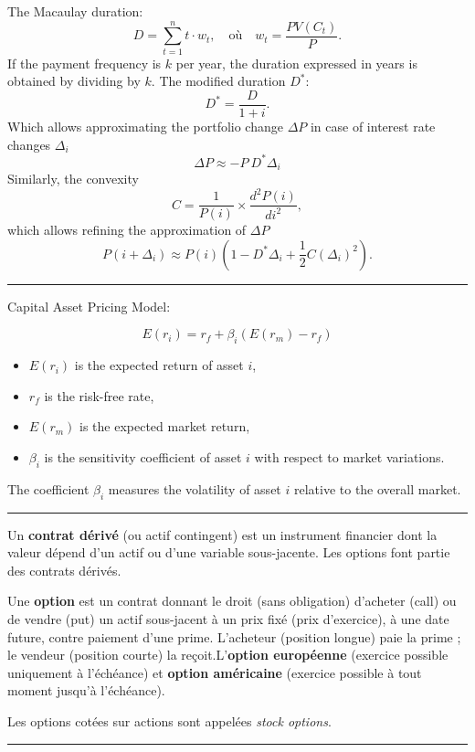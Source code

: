 \begin{f}
	
The Macaulay duration:
\[ 		
D = \sum_{t=1}^{n} t \cdot w_t, \quad \text{où} \quad w_t = \frac{PV(C_t)}{P}.
 \]	
If the payment frequency is $k$ per year, the duration expressed in years is obtained by dividing by $k$.
The modified duration $D^*$:
\[ 	
D^* = \frac{D}{1 + i}.
 \]
Which allows approximating the portfolio change $\Delta P$ in case of interest rate changes $\Delta_i$
\[ 
\Delta P \approx -P\ D^* \Delta_i 
 \]
Similarly, the convexity
\[ 	
C = \frac{1}{P(i)} \times \frac{d^2 P(i)}{di^2},
 \]
which allows refining the approximation of $\Delta P$
\[ 	
P(i + \Delta_i) \approx P(i) \left( 1 -D^*\Delta_i + \frac{1}{2} C (\Delta_i)^2 \right).
 \]
\end{f}
\hrule



\begin{f}[CAPM]
	Capital Asset Pricing Model:

\[
E(r_i) = r_f + \beta_i (E(r_m) - r_f)
\]

\begin{itemize}
	\item \( E(r_i) \) is the expected return of asset \( i \),
	\item \( r_f \) is the risk-free rate,
	\item \( E(r_m) \) is the expected market return,
	\item \( \beta_i \) is the sensitivity coefficient of asset \( i \) with respect to market variations.
\end{itemize}


The coefficient \( \beta_i \) measures the volatility of asset \( i \) relative to the overall market.

\end{f}
\hrule


\begin{f}

Un \textbf{contrat dérivé} (ou actif contingent) est un instrument financier dont la valeur dépend d’un actif ou d’une variable sous-jacente. Les options font partie des contrats dérivés.


Une \textbf{option} est un contrat donnant le droit (sans obligation) d’acheter (call) ou de vendre (put) un actif sous-jacent à un prix fixé (prix d’exercice), à une date future, contre paiement d’une prime. 
L’acheteur (position longue) paie la prime ; le vendeur (position courte) la reçoit.L'\textbf{option européenne}  (exercice possible uniquement à l’échéance) et   
 \textbf{option américaine} (exercice possible à tout moment jusqu’à l’échéance).

Les options cotées sur actions sont appelées \textit{stock options}.

\end{f}
\hrule


